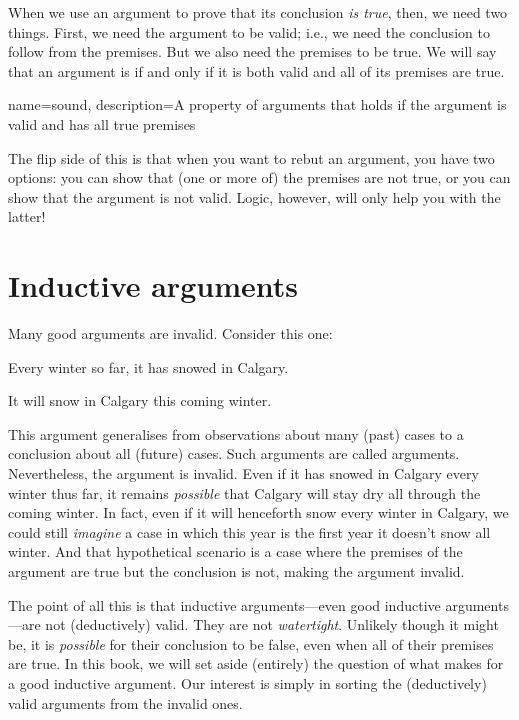 When we use an argument to prove that its conclusion \emph{is true}, then, we need two things. First, we need the argument to be valid; i.e., we need the conclusion to follow from the premises. But we also need the premises to be true. We will say that an argument is  if and only if it is both valid and all of its premises are true.

{
name=sound,
description={A property of arguments that holds if the argument is valid and has all true premises}
}

The flip side of this is that when you want to rebut an argument, you have two options: you can show that (one or more of) the premises are not true, or you can show that the argument is not valid.  Logic, however, will only help you with the latter!  

\section{Inductive arguments}

Many good arguments are invalid. Consider this one:
	\begin{earg}
		\item[] Every winter so far, it has snowed in Calgary.
	\item[\texttherefore] It will snow in Calgary this coming winter.
\end{earg}
This argument generalises from observations about many (past) cases to a conclusion about all (future) cases. Such arguments are called  arguments. Nevertheless, the argument is invalid. Even if it has snowed in Calgary every winter thus far, it remains \emph{possible} that Calgary will stay dry all through the coming winter. In fact, even if it will henceforth snow every winter in Calgary, we could still \emph{imagine} a case in which this year is the first year it doesn't snow all winter. And that hypothetical scenario is a case where the premises of the argument are true but the conclusion is not, making the argument invalid.

The point of all this is that inductive arguments---even good inductive arguments---are not (deductively) valid. They are not \emph{watertight}. Unlikely though it might be, it is \emph{possible} for their conclusion to be false, even when all of their premises are true. In this book, we will set aside (entirely) the question of what makes for a good inductive argument. Our interest is simply in sorting the (deductively) valid arguments from the invalid ones.  


